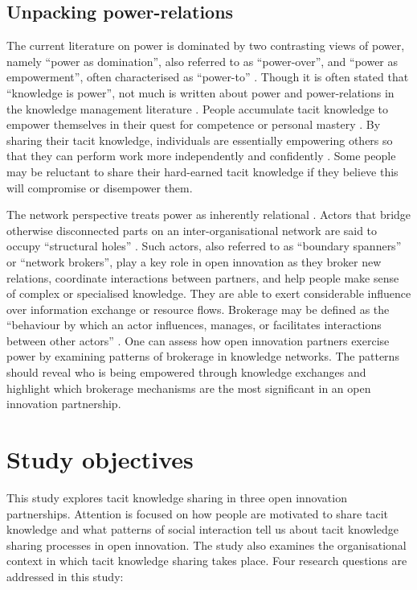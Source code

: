 \subsection{Unpacking power-relations} 

The current literature on power is dominated by two contrasting views of power, namely \enquote{power as domination}, also referred to as \enquote{power\hyp{}over}, and \enquote{power as empowerment}, often characterised as \enquote{power\hyp{}to} \citep{haugaard2012rethinking}. Though it is often stated that \enquote{knowledge is power}, not much is written about power and power\hyp{}relations in the knowledge management literature \citep{haugaard2012rethinking}. People accumulate tacit knowledge to empower themselves in their quest for competence or personal mastery \citep{endres2007tacit}. By sharing their tacit knowledge, individuals are essentially empowering others so that they can perform work more independently and confidently \citep{bordum2002tacit,lin2007share}. Some people may be reluctant to share their hard-earned tacit knowledge if they believe this will compromise or disempower them. \medskip

The network perspective treats power as inherently relational \citep{ibarra1993power}. Actors that bridge otherwise disconnected parts on an inter\hyp{}organisational network are said to occupy \enquote{structural holes} \citep{burt1992structural}. Such actors, also referred to as \enquote{boundary spanners} or \enquote{network brokers}, play a key role in open innovation as they broker new relations, coordinate interactions between partners, and help people make sense of complex or specialised knowledge. They are able to exert considerable influence over information exchange or resource flows. Brokerage may be defined as the \enquote{behaviour by which an actor influences,
manages, or facilitates interactions between other actors} \citep{obstfeld2014brokerage}. One can assess how open innovation partners exercise power by examining patterns of brokerage in knowledge networks. The patterns should reveal who is being empowered through knowledge exchanges and highlight which brokerage mechanisms are the most significant in an open innovation partnership. \medskip

\section{Study objectives}

This study explores tacit knowledge sharing in three open innovation partnerships. Attention is focused on how people are motivated to share tacit knowledge and what patterns of social interaction tell us about tacit knowledge sharing processes in open innovation. The study also examines the organisational context in which tacit knowledge sharing takes place. Four research questions are addressed in this study: \medskip

